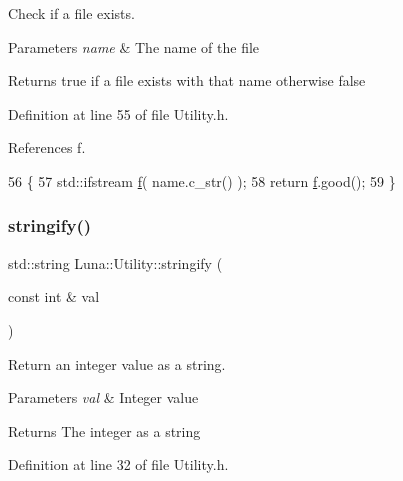 Check if a file exists. 


\begin{DoxyParams}{Parameters}
{\em name} & The name of the file \\
\hline
\end{DoxyParams}
\begin{DoxyReturn}{Returns}
true if a file exists with that name otherwise false 
\end{DoxyReturn}


Definition at line 55 of file Utility.\+h.



References f.


\begin{DoxyCode}
56   \{
57     std::ifstream \hyperlink{Nonlinear__ODE__BVP_8cpp_a06fc87d81c62e9abb8790b6e5713c55ba7ce756344023b99e5ab27b804feb765c}{f}( name.c\_str() );
58     \textcolor{keywordflow}{return} \hyperlink{Nonlinear__ODE__BVP_8cpp_a06fc87d81c62e9abb8790b6e5713c55ba7ce756344023b99e5ab27b804feb765c}{f}.good();
59   \}
\end{DoxyCode}
\mbox{\label{namespaceLuna_1_1Utility_a7a21ee8e724765b7a018b6a5394b7e9c}} 
\subsubsection{\texorpdfstring{stringify()}{stringify()}\hspace{0.1cm}{\footnotesize\ttfamily [1/2]}}
{\footnotesize\ttfamily std\+::string Luna\+::\+Utility\+::stringify (\begin{DoxyParamCaption}\item[{const int \&}]{val }\end{DoxyParamCaption})}



Return an integer value as a string. 


\begin{DoxyParams}{Parameters}
{\em val} & Integer value \\
\hline
\end{DoxyParams}
\begin{DoxyReturn}{Returns}
The integer as a string 
\end{DoxyReturn}


Definition at line 32 of file Utility.\+h.



